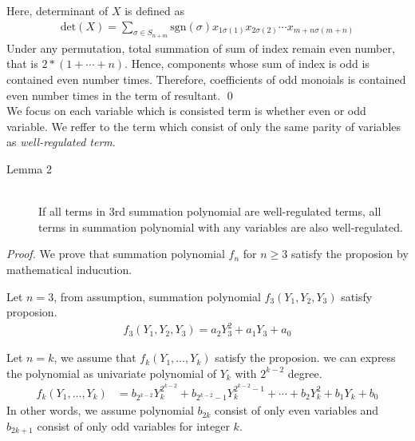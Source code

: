 Here, determinant of $X$ is defined as
%
\begin{align*}
  \mbox{det}(X) = \sum_{\sigma \in S_{n+m}} \mbox{sgn}(\sigma)x_{1\sigma(1)}
                   x_{2\sigma(2)}\cdots x_{m+n\sigma(m+n)}
\end{align*}
%
Under any permutation, total summation of sum of index remain even number,
that is $2*(1+ \cdots +n)$.
%
Hence, components whose sum of index is odd is contained even number times.
%
Therefore, coefficients of odd monoials is contained even number times
in the term of resultant.
\qed \\

We focus on each variable which is consisted term
is whether even or odd variable.
%
We reffer to the term which consist of only the same parity of variables
as \emph{well-regulated term}.


\begin{description}
  \item [Lemma 2]~\\
  If all terms in 3rd summation polynomial are well-regulated terms,
  all terms in summation polynomial with any variables are also
  well-regulated.
\end{description}

\noindent
\emph{Proof.}
%
We prove that summation polynomial $f_{n}$ for $n\geq3$ satisfy the
proposion by mathematical inducution.

Let $n=3$, from assumption, summation polynomial $f_3(Y_1, Y_2, Y_3)$
satisfy proposion.
%
\begin{align*}
  f_{3}(Y_1, Y_2, Y_3)=a_2Y_3^2 + a_1Y_3 + a_0
\end{align*}
%

Let $n=k$, we assume that $f_{k}(Y_1, \dots , Y_{k})$ satisfy the proposion.
% 
we can express the polynomial as univariate polynomial of $Y_{k}$ 
with $2^{k-2}$ degree. 
%
\begin{align*}
  f_{k}(Y_1, \dots , Y_{k}) & = 
  b_{2^{k-2}}Y_{k}^{2^{k-2}} + b_{2^{k-2}-1}Y_{k}^{2^{k-2}-1} + 
   \cdots + b_2Y_{k}^2 + b_1Y_{k} + b_0
\end{align*}
%
In other words, we assume polynomial $b_{2k}$ consist of only even variables 
and $b_{2k+1}$ consist of only odd variables for integer $k$.

